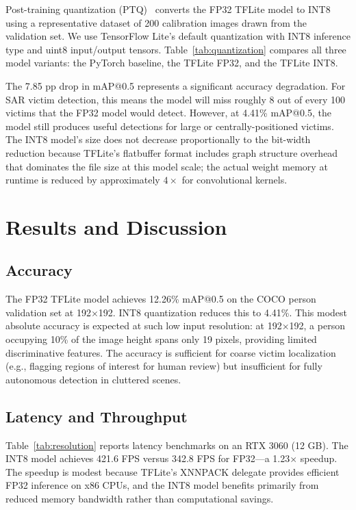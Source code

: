 \documentclass[10pt,twocolumn]{article}
\begin{document}
Post-training quantization (PTQ)~\cite{jacob2018,krishnamoorthi2018,gholami2021survey} converts the FP32 TFLite model to INT8 using a representative dataset of 200 calibration images drawn from the validation set. We use TensorFlow Lite's default quantization with INT8 inference type and uint8 input/output tensors. Table~\ref{tab:quantization} compares all three model variants: the PyTorch baseline, the TFLite FP32, and the TFLite INT8.



The 7.85 pp drop in mAP@0.5 represents a significant accuracy degradation. For SAR victim detection, this means the model will miss roughly 8 out of every 100 victims that the FP32 model would detect. However, at 4.41\% mAP@0.5, the model still produces useful detections for large or centrally-positioned victims. The INT8 model's size does not decrease proportionally to the bit-width reduction because TFLite's flatbuffer format includes graph structure overhead that dominates the file size at this model scale; the actual weight memory at runtime is reduced by approximately $4\times$ for convolutional kernels.

\section{Results and Discussion}
\label{sec:results}

\subsection{Accuracy}
The FP32 TFLite model achieves 12.26\% mAP@0.5 on the COCO person validation set at 192$\times$192. INT8 quantization reduces this to 4.41\%. This modest absolute accuracy is expected at such low input resolution: at 192$\times$192, a person occupying 10\% of the image height spans only 19 pixels, providing limited discriminative features. The accuracy is sufficient for coarse victim localization (e.g., flagging regions of interest for human review) but insufficient for fully autonomous detection in cluttered scenes.

\subsection{Latency and Throughput}
Table~\ref{tab:resolution} reports latency benchmarks on an RTX 3060 (12 GB). The INT8 model achieves 421.6 FPS versus 342.8 FPS for FP32---a 1.23$\times$ speedup. The speedup is modest because TFLite's XNNPACK delegate provides efficient FP32 inference on x86 CPUs, and the INT8 model benefits primarily from reduced memory bandwidth rather than computational savings.
\end{document}
